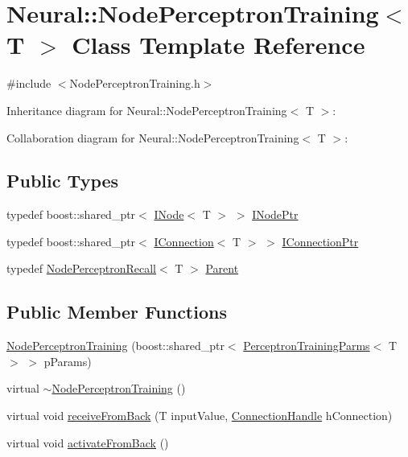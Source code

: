 \hypertarget{class_neural_1_1_node_perceptron_training}{
\section{Neural::NodePerceptronTraining$<$ T $>$ Class Template Reference}
\label{class_neural_1_1_node_perceptron_training}
}


{\ttfamily \#include $<$NodePerceptronTraining.h$>$}



Inheritance diagram for Neural::NodePerceptronTraining$<$ T $>$:


Collaboration diagram for Neural::NodePerceptronTraining$<$ T $>$:
\subsection*{Public Types}
\begin{DoxyCompactItemize}
\item 
typedef boost::shared\_\-ptr$<$ \hyperlink{class_neural_1_1_i_node}{INode}$<$ T $>$ $>$ \hyperlink{class_neural_1_1_node_perceptron_training_a648d54b9404344efb202207fd40cf769}{INodePtr}
\item 
typedef boost::shared\_\-ptr$<$ \hyperlink{class_neural_1_1_i_connection}{IConnection}$<$ T $>$ $>$ \hyperlink{class_neural_1_1_node_perceptron_training_acf502a8079c8e875773ac940986af738}{IConnectionPtr}
\item 
typedef \hyperlink{class_neural_1_1_node_perceptron_recall}{NodePerceptronRecall}$<$ T $>$ \hyperlink{class_neural_1_1_node_perceptron_training_a0161b405428cffdd067f35a6cff135ed}{Parent}
\end{DoxyCompactItemize}
\subsection*{Public Member Functions}
\begin{DoxyCompactItemize}
\item 
\hyperlink{class_neural_1_1_node_perceptron_training_a85701129e9b0049150958135f55b9a08}{NodePerceptronTraining} (boost::shared\_\-ptr$<$ \hyperlink{class_neural_1_1_perceptron_training_parms}{PerceptronTrainingParms}$<$ T $>$ $>$ pParams)
\item 
virtual \hyperlink{class_neural_1_1_node_perceptron_training_a8f4cd195d594617f77b313a3eed9b699}{$\sim$NodePerceptronTraining} ()
\item 
virtual void \hyperlink{class_neural_1_1_node_perceptron_training_afe3d66a4f1149b7df640b99dc1919f28}{receiveFromBack} (T inputValue, \hyperlink{namespace_neural_a73b2763d14999ad4308dbf4246aa503f}{ConnectionHandle} hConnection)
\item 
virtual void \hyperlink{class_neural_1_1_node_perceptron_training_a2b0125c4dd40d69d8c9bd3879484b2af}{activateFromBack} ()
\end{DoxyCompactItemize}
